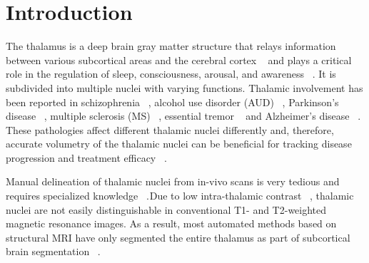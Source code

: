 \documentclass[3p,,final,12pt]{elsarticle}
\begin{document}
\maketitle

    
\section{Introduction}
 The thalamus is a deep brain gray matter structure that relays information between various subcortical areas and the cerebral cortex \unskip~\cite{1643371:26789934} and plays a critical role in the regulation of sleep, consciousness, arousal, and awareness \unskip~\cite{1643371:26789969,1643371:26789903,1643371:26789938}. It is subdivided into multiple nuclei with varying functions. Thalamic involvement has been reported in schizophrenia \unskip~\cite{1643371:26789949,1643371:26789927}, alcohol use disorder (AUD) \unskip~\cite{1643371:26789925,1643371:26789936}, Parkinson's disease \unskip~\cite{1643371:26789951}, multiple sclerosis (MS) \unskip~\cite{1643371:26789909}, essential tremor \unskip~\cite{1643371:26789937,1643371:26789916,1643371:26789943} and Alzheimer's disease \unskip~\cite{1643371:26789944}. These pathologies affect different thalamic nuclei differently and, therefore, accurate volumetry of the thalamic nuclei can be beneficial for tracking disease progression and treatment efficacy \unskip~\cite{1643371:26789944,1643371:26789946}. 

Manual delineation of thalamic nuclei from in-vivo scans is very tedious and requires specialized knowledge \unskip~\cite{1643371:26789922,1643371:26789924}.\ensuremath{^{}}Due to low intra-thalamic contrast \unskip~\cite{1643371:26789961}, thalamic nuclei are not easily distinguishable in conventional T1- and T2-weighted magnetic resonance images. As a result, most automated methods based on structural MRI have only segmented the entire thalamus as part of subcortical brain segmentation \unskip~\cite{1643371:26789935,1643371:26789929,1643371:26789926,1643371:26789933,1643371:26789917}.\ensuremath{^{}}
\end{document}
